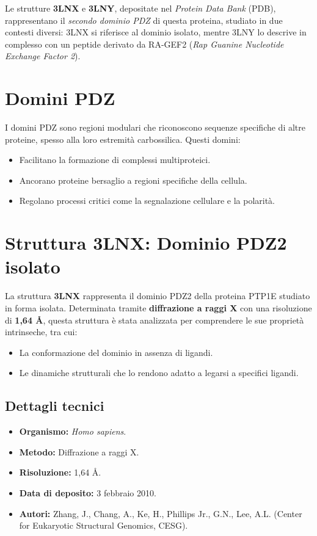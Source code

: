 \documentclass[Lau,binding=0.6cm,oneside,noexaminfo]{sapthesis}
\begin{document}
Le strutture \textbf{3LNX} e \textbf{3LNY}, depositate nel \textit{Protein Data Bank} (PDB), rappresentano il \textit{secondo dominio PDZ} di questa proteina, studiato in due contesti diversi: 3LNX si riferisce al dominio isolato, mentre 3LNY lo descrive in complesso con un peptide derivato da RA-GEF2 (\textit{Rap Guanine Nucleotide Exchange Factor 2}).

\section{Domini PDZ}
I domini PDZ sono regioni modulari che riconoscono sequenze specifiche di altre proteine, spesso alla loro estremità carbossilica. Questi domini:
\begin{itemize}
    \item Facilitano la formazione di complessi multiproteici.
    \item Ancorano proteine bersaglio a regioni specifiche della cellula.
    \item Regolano processi critici come la segnalazione cellulare e la polarità.
\end{itemize}

\section{Struttura 3LNX: Dominio PDZ2 isolato}
La struttura \textbf{3LNX} rappresenta il dominio PDZ2 della proteina PTP1E studiato in forma isolata. Determinata tramite \textbf{diffrazione a raggi X} con una risoluzione di \textbf{1,64 Å}, questa struttura è stata analizzata per comprendere le sue proprietà intrinseche, tra cui:
\begin{itemize}
    \item La conformazione del dominio in assenza di ligandi.
    \item Le dinamiche strutturali che lo rendono adatto a legarsi a specifici ligandi.
\end{itemize}

\subsection{Dettagli tecnici}
\begin{itemize}
    \item \textbf{Organismo:} \textit{Homo sapiens}.
    \item \textbf{Metodo:} Diffrazione a raggi X.
    \item \textbf{Risoluzione:} 1,64 Å.
    \item \textbf{Data di deposito:} 3 febbraio 2010.
    \item \textbf{Autori:} Zhang, J., Chang, A., Ke, H., Phillips Jr., G.N., Lee, A.L. (Center for Eukaryotic Structural Genomics, CESG).
\end{itemize}
\end{document}
